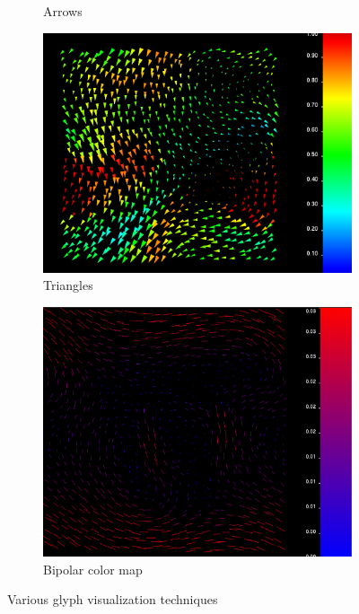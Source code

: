 \begin{figure}[htb]
\begin{subfigure}[htb]{.49\textwidth}
		        \caption{Arrows}
		        \label{fig:arrows}
		    \end{subfigure}
		    \begin{subfigure}[htb]{.49\textwidth}
		        \includegraphics[width =\textwidth]{content/pictures/triangles.png}
		        \caption{Triangles}
		        \label{fig:triangles}
		    \end{subfigure}
		    \begin{subfigure}[htb]{.49\textwidth}
		        \includegraphics[width =\textwidth]{content/pictures/bipolar_glyphs.png}
		        \caption{Bipolar color map}
		        \label{fig:bipolar}
		    \end{subfigure}
		    \caption{Various glyph visualization techniques}
		    \label{fig:glyph_shapes}
		\end{figure}
